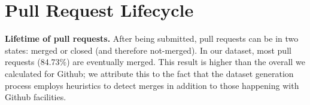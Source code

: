 \documentclass{sig-alternate}
\begin{document}
%


\noindent
{}
%

%

\section{Pull Request Lifecycle}
\label{sec:pullreqchar}

\textbf{Lifetime of pull requests.}
After being submitted, pull requests can be in two states: merged or closed
(and therefore not-merged).
In our dataset, most pull requests (84.73\%) are eventually
merged. This result is higher than the overall we calculated for
Github; we attribute this to the fact that the dataset generation
process employs heuristics to detect merges in addition to those happening
with Github facilities.
\end{document}
